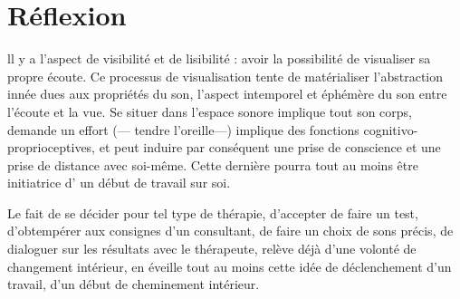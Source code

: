 \section{Réflexion}

ll y a l'aspect de visibilité et de lisibilité : avoir  la possibilité de visualiser sa propre écoute. Ce processus de visualisation tente de matérialiser l'abstraction innée dues aux propriétés du son, l'aspect intemporel et éphémère du son entre l'écoute et la vue. Se situer dans l'espace sonore implique tout son corps, demande un effort (--- tendre l'oreille---) implique des fonctions cognitivo-proprioceptives, et peut induire par conséquent  une prise de conscience et une prise de distance avec soi-même. Cette dernière pourra tout au  moins être initiatrice d' un début de travail sur soi.  

Le fait de se décider pour tel type de thérapie, d'accepter de faire un test, d'obtempérer aux consignes d'un consultant, de faire un choix de sons précis, de dialoguer sur les résultats avec le thérapeute, relève déjà d'une volonté de changement intérieur, en  éveille tout au moins cette idée de déclenchement d'un travail, d'un début de cheminement intérieur.

